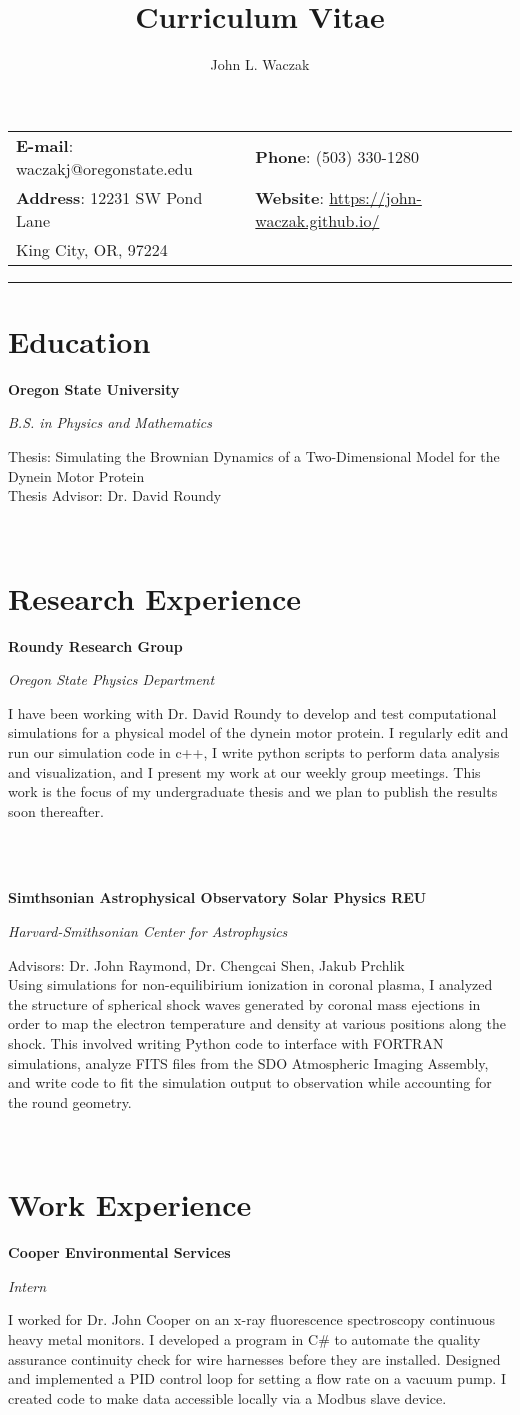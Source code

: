 \documentclass{article}
\makeatletter
\renewcommand{\maketitle}{
  \begin{center}
    {\huge\bfseries
      \theauthor}

    \vspace{1em}

    \begin{tabular}{l l}
      {\textbf{E-mail}:}  waczakj@oregonstate.edu   & {\textbf{Phone}:}  (503) 330-1280 \\
      {\textbf{Address}:} 12231 SW Pond Lane & {\textbf{Website}:}  \url{https://john-waczak.github.io/}\\
      \hspace{4.5em} King City, OR, 97224  
    \end{tabular}
    \vspace{1em}
    \par\noindent\rule{\textwidth}{1pt}
  \end{center}
}
\newcommand{\entry}[4]{
  \begin{minipage}[t]{0.15\textwidth}
    \hfill \raggedleft{\textsc{#1}}
  \end{minipage}
  \hfill\vline\hfill
  \begin{minipage}[t]{0.80\textwidth}
    \large{\textbf{#2}}

    \textit{#3}

    \vspace{0.5em}
    \footnotesize{#4}

  \end{minipage}\\ \vspace{0.25em}
}
\makeatother
\begin{document}
\title{Curriculum Vitae}
\author{John L. Waczak}
\maketitle


\section{Education}
\entry{2015-2019}
      {Oregon State University}
      {B.S. in Physics and Mathematics}
      {Thesis: Simulating the Brownian Dynamics of a Two-Dimensional Model for the Dynein Motor Protein \\
      Thesis Advisor: Dr. David Roundy}

\section{Research Experience}
\entry{2016 - Now}
      {Roundy Research Group}
      {Oregon State Physics Department}
      {I have been working with Dr. David Roundy to develop and test computational simulations for a physical model of the dynein motor protein. I regularly edit and run our simulation code in c++, I write python scripts to perform data analysis and visualization, and I present my work at our weekly group meetings. This work is the focus of my undergraduate thesis and we plan to publish the results soon thereafter.}\vspace{0.5em}\\
\entry{Jun-Aug \\ 2018}
      {Simthsonian Astrophysical Observatory Solar Physics REU}
      {Harvard-Smithsonian Center for Astrophysics}
      {Advisors: Dr. John Raymond, Dr. Chengcai Shen, Jakub Prchlik \vspace{0.25em}\\
        Using simulations for non-equilibirium ionization in coronal plasma, I analyzed the structure of spherical shock waves generated by coronal mass ejections in order to map the electron temperature and density at various positions along the shock. This involved writing Python code to interface with FORTRAN simulations, analyze FITS files from the SDO Atmospheric Imaging Assembly, and write code to fit the simulation output to observation while accounting for the round geometry.
      }

\section{Work Experience}
\entry{2015 \\ -Aug 2018}
      {Cooper Environmental Services}
      {Intern}
      {I worked for Dr. John Cooper on an x-ray fluorescence spectroscopy continuous heavy metal monitors. I developed a program in C\# to automate the quality assurance continuity check for wire harnesses before they are installed. Designed and implemented a PID control loop for setting a flow rate on a vacuum pump. I created code to make data accessible locally via a Modbus slave device.}
\end{document}
